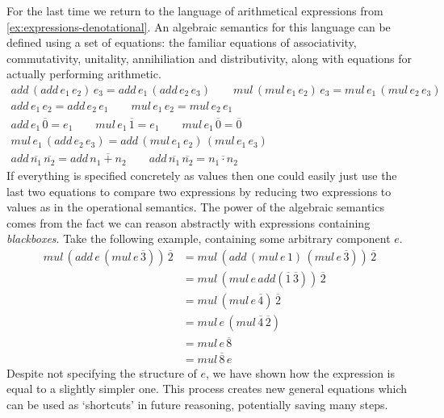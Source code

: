 \begin{example}\label{ex:expressions-algebraic}
    For the last time we return to the language of arithmetical expressions from
    \cref{ex:expressions-denotational}.
    An algebraic semantics for this language can be defined using a set of
    equations: the familiar equations of associativity, commutativity,
    unitality, annihiliation and distributivity, along with equations for
    actually performing arithmetic.
    \begin{gather*}
        add\,(add\,e_1\,e_2)\,e_3 = add\,e_1\,(add\,e_2\,e_3)
        \qquad
        mul\,(mul\,e_1\,e_2)\,e_3 = mul\,e_1\,(mul\,e_2\,e_3)
        \\
        add\,e_1\,e_2 = add\,e_2\,e_1
        \qquad
        mul\,e_1\,e_2 = mul\,e_2\,e_1
        \\
        add\,e_1\,\overline{0} = e_1
        \qquad
        mul\,e_1\,\overline{1} = e_1
        \qquad
        mul\,e_1\,\overline{0} = \overline{0}
        \\
        mul\,e_1\,(add\,e_2\,e_3) = add\,(mul\,e_1\,e_2)\,(mul\,e_1\,e_3)
        \\
        add\,\overline{n_1}\,\overline{n_2} = add\,\overline{n_1+n_2}
        \qquad
        add\,\overline{n_1}\,\overline{n_2} = \overline{n_1 \cdot n_2}
    \end{gather*}
    If everything is specified concretely as values then one could easily just
    use the last two equations to compare two expressions by reducing
    two expressions to values as in the operational semantics.
    The power of the algebraic semantics comes from the fact we can reason
    abstractly with expressions containing \emph{blackboxes}.
    Take the following example, containing some arbitrary component \(e\).
    \begin{align*}
        mul\,(add\,e\,(mul\,e\,\overline{3}))\,\overline{2}
         & =
        mul\,(add\,(mul\,e\,1)\,(mul\,e\,\overline{3}))\,\overline{2}
        \\
         & =
        mul\,(mul\,e\, add(\overline{1}\,\overline{3}))\,\overline{2}
        \\
         & =
        mul\,(mul \,e\,\overline{4})\,\overline{2}
        \\
         & =
        mul\,e\,(mul \,\overline{4}\,\overline{2})
        \\
         & =
        mul\,e\,\overline{8}
        \\
         & =
        mul\,\overline{8}\,e
    \end{align*}
    Despite not specifying the structure of \(e\), we have
    shown how the expression is equal to a slightly simpler one.
    This process creates new general equations which can be used as `shortcuts'
    in future reasoning, potentially saving many steps.
\end{example}

